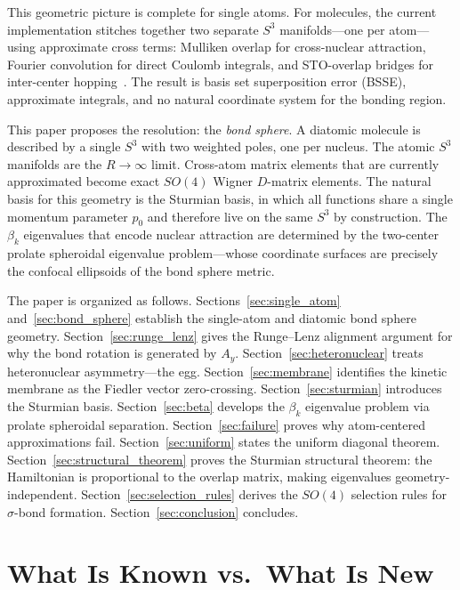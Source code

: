 \documentclass[aps,pra,twocolumn,superscriptaddress,longbibliography]{revtex4-2}
\begin{document}
This geometric picture is complete for single atoms.  For molecules, the
current implementation stitches together two separate $S^3$
manifolds---one per atom---using approximate cross terms: Mulliken overlap
for cross-nuclear attraction, Fourier convolution for direct Coulomb
integrals, and STO-overlap bridges for inter-center
hopping~\cite{loutey_fci}.  The result is basis set superposition error
(BSSE), approximate integrals, and no natural coordinate system for the
bonding region.

This paper proposes the resolution: the \emph{bond sphere}.  A diatomic
molecule is described by a single $S^3$ with two weighted poles, one per
nucleus.  The atomic $S^3$ manifolds are the $R \to \infty$ limit.
Cross-atom matrix elements that are currently approximated become exact
$SO(4)$ Wigner $D$-matrix elements.  The natural basis for this geometry
is the Sturmian basis, in which all functions share a single momentum
parameter $p_0$ and therefore live on the same $S^3$ by construction.
The $\beta_k$ eigenvalues that encode nuclear attraction are determined
by the two-center prolate spheroidal eigenvalue problem---whose coordinate
surfaces are precisely the confocal ellipsoids of the bond sphere metric.

The paper is organized as follows.  Sections~\ref{sec:single_atom}
and~\ref{sec:bond_sphere} establish the single-atom and diatomic bond
sphere geometry.  Section~\ref{sec:runge_lenz} gives the Runge--Lenz
alignment argument for why the bond rotation is generated by $A_y$.
Section~\ref{sec:heteronuclear} treats heteronuclear asymmetry---the
egg.  Section~\ref{sec:membrane} identifies the kinetic membrane as
the Fiedler vector zero-crossing.  Section~\ref{sec:sturmian} introduces
the Sturmian basis.  Section~\ref{sec:beta} develops the $\beta_k$
eigenvalue problem via prolate spheroidal separation.
Section~\ref{sec:failure} proves why atom-centered approximations fail.
Section~\ref{sec:uniform} states the uniform diagonal theorem.
Section~\ref{sec:structural_theorem} proves the Sturmian structural
theorem: the Hamiltonian is proportional to the overlap matrix, making
eigenvalues geometry-independent.
Section~\ref{sec:selection_rules} derives the $SO(4)$ selection rules
for $\sigma$-bond formation.
Section~\ref{sec:conclusion} concludes.


\section{What Is Known vs.\ What Is New}
\label{sec:attribution}
\end{document}
